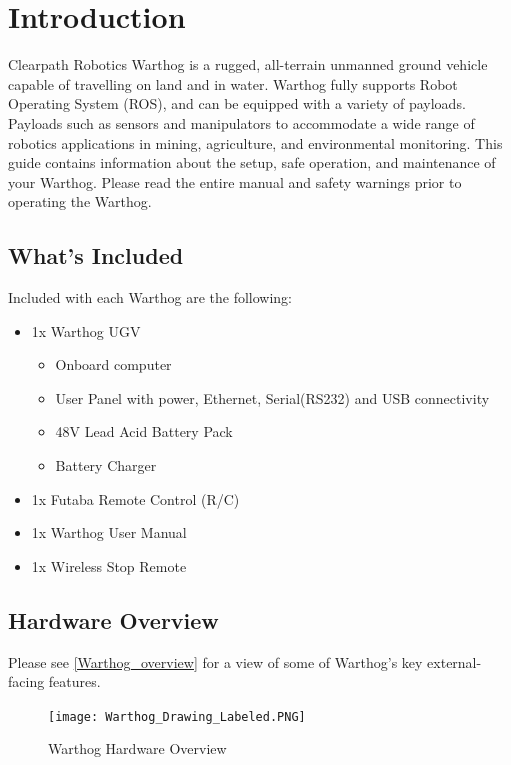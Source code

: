 \documentclass[]{clearpath-latex/clearpath-manual}
\begin{document}
\tableofcontents

\section{Introduction}
Clearpath Robotics Warthog is a rugged, all-terrain unmanned ground vehicle capable of travelling on land and in water.  Warthog fully supports Robot Operating System (ROS), and can be equipped with a variety of payloads. Payloads such as sensors and manipulators to accommodate a wide range of robotics applications in mining, agriculture, and environmental monitoring. This guide contains information about the setup, safe operation, and maintenance of your Warthog.  Please read the entire manual and safety warnings prior to operating the Warthog.

\subsection{What's Included}

Included with each Warthog are the following:

\begin{itemize}[nolistsep]
  \item 1x Warthog UGV
  \begin{itemize}
    \item{Onboard computer}
    \item{User Panel with power, Ethernet, Serial(RS232) and USB connectivity}
    \item{48V Lead Acid Battery Pack}
    \item{Battery Charger}
  \end{itemize}
  \item 1x Futaba Remote Control (R/C)
  \item 1x Warthog User Manual
  \item 1x Wireless Stop Remote
\end{itemize}



\pagebreak[4]
\subsection{Hardware Overview}

Please see \autoref{Warthog_overview} for a view of some of Warthog's key external-facing features.

\begin{figure}[h]
  \centering
  \texttt{[image: Warthog\_Drawing\_Labeled.PNG]}
  \caption{Warthog Hardware Overview}
  \label{Warthog_overview}
\end{figure}
\end{document}
